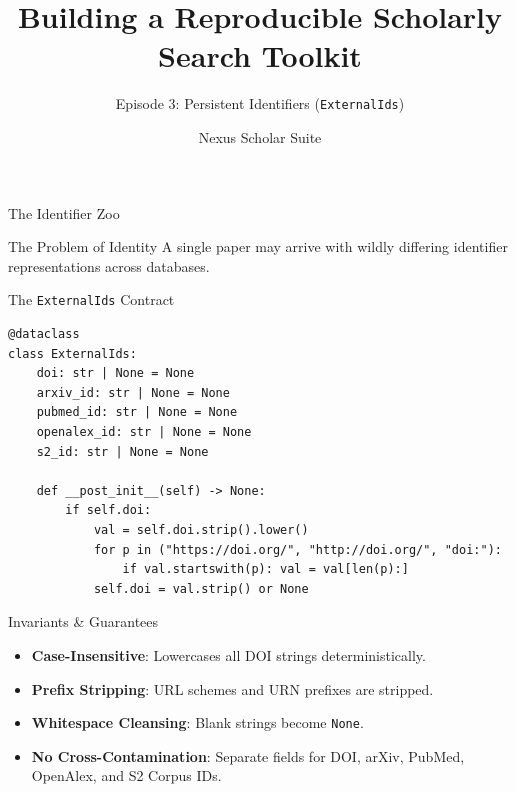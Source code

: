 \documentclass[aspectratio=169]{beamer}
\title{Building a Reproducible Scholarly Search Toolkit}
\subtitle{Episode 3: Persistent Identifiers (\texttt{ExternalIds})}
\author{Nexus Scholar Suite}
\date{}
\begin{document}
\begin{frame}[plain]
  \titlepage
\end{frame}

\begin{frame}{The Identifier Zoo}
  \begin{alertblock}{The Problem of Identity}
    A single paper may arrive with wildly differing identifier representations across databases.
  \end{alertblock}
  \vspace{0.4cm}
  \begin{center}
  \end{center}
\end{frame}

\begin{frame}[fragile]{The \texttt{ExternalIds} Contract}
\begin{lstlisting}[style=nexuspython]
@dataclass
class ExternalIds:
    doi: str | None = None
    arxiv_id: str | None = None
    pubmed_id: str | None = None
    openalex_id: str | None = None
    s2_id: str | None = None

    def __post_init__(self) -> None:
        if self.doi:
            val = self.doi.strip().lower()
            for p in ("https://doi.org/", "http://doi.org/", "doi:"):
                if val.startswith(p): val = val[len(p):]
            self.doi = val.strip() or None
\end{lstlisting}
\end{frame}

\begin{frame}{Invariants \& Guarantees}
  \begin{itemize}
    \item \textbf{Case-Insensitive}: Lowercases all DOI strings deterministically.
    \item \textbf{Prefix Stripping}: URL schemes and URN prefixes are stripped.
    \item \textbf{Whitespace Cleansing}: Blank strings become \texttt{None}.
    \item \textbf{No Cross-Contamination}: Separate fields for DOI, arXiv, PubMed, OpenAlex, and S2 Corpus IDs.
  \end{itemize}
\end{frame}
\end{document}
